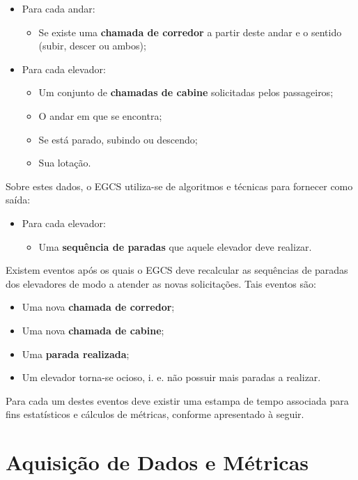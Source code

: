 \begin{itemize}
  \item Para cada andar:
  \begin{itemize}
    \item Se existe uma \textbf{chamada de corredor} a partir deste andar e o sentido (subir, descer ou ambos);
  \end{itemize}
  \item Para cada elevador:
  \begin{itemize}
    \item Um conjunto de \textbf{chamadas de cabine} solicitadas pelos passageiros;
    \item O andar em que se encontra;
    \item Se está parado, subindo ou descendo;
    \item Sua lotação.
  \end{itemize}
\end{itemize}

Sobre estes dados, o EGCS utiliza-se de algoritmos e técnicas para fornecer como saída:

\begin{itemize}
  \item Para cada elevador:
  \begin{itemize}
    \item Uma \textbf{sequência de paradas} que aquele elevador deve realizar.
  \end{itemize}
\end{itemize}

Existem eventos após os quais o EGCS deve recalcular as sequências de paradas dos elevadores de modo a atender as novas solicitações. Tais eventos são:

\begin{itemize}
  \item Uma nova \textbf{chamada de corredor};
  \item Uma nova \textbf{chamada de cabine};
  \item Uma \textbf{parada realizada};
  \item Um elevador torna-se ocioso, i. e. não possuir mais paradas a realizar.
\end{itemize}

Para cada um destes eventos deve existir uma estampa de tempo associada para fins estatísticos e cálculos de métricas, conforme apresentado à seguir.

\section{Aquisição de Dados e Métricas}

